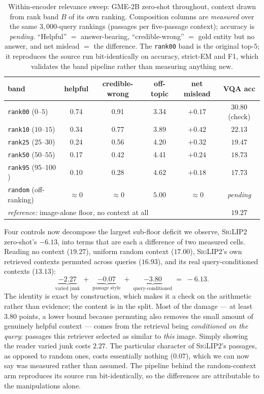 \begin{table}[t]
\centering\small
\caption{Within-encoder relevance sweep: \textsc{GME-2B} zero-shot throughout, context drawn from
rank band $B$ of its own ranking. Composition columns are \emph{measured} over the same
$3{,}000$-query rankings (passages per five-passage context); accuracy is \emph{pending}.
``Helpful'' $=$ answer-bearing, ``credible-wrong'' $=$ gold entity but no answer, and net mislead
$=$ the difference. The \texttt{rank00} band is the original top-$5$; it reproduces the source run
bit-identically on accuracy, strict-EM and F1, which validates the band pipeline rather than
measuring anything new.}
\label{tab:mm_bands}
\begin{tabular}{lccccc}
\toprule
band & helpful & credible-wrong & off-topic & net mislead & VQA acc \\
\midrule
\texttt{rank00} ($0$--$5$)    & 0.74 & 0.91 & 3.34 & $+0.17$ & $30.80$ (check) \\
\texttt{rank10} ($10$--$15$)  & 0.34 & 0.77 & 3.89 & $\mathbf{+0.42}$ & $22.13$ \\
\texttt{rank25} ($25$--$30$)  & 0.24 & 0.56 & 4.20 & $+0.32$ & $19.47$ \\
\texttt{rank50} ($50$--$55$)  & 0.17 & 0.42 & 4.41 & $+0.24$ & $18.73$ \\
\texttt{rank95} ($95$--$100$) & 0.10 & 0.28 & 4.62 & $+0.18$ & $17.73$ \\
\texttt{random} (off-ranking) & ${\approx}0$ & ${\approx}0$ & $5.00$ & ${\approx}0$ & \emph{pending} \\
\midrule
\multicolumn{5}{l}{\emph{reference:} image-alone floor, no context at all} & $19.27$ \\
\bottomrule
\end{tabular}
\end{table}

Four controls now decompose the largest sub-floor deficit we observe, \textsc{SigLIP2}
zero-shot's $-6.13$, into terms that are each a difference of two measured cells. Reading no
context ($19.27$), uniform random context ($17.00$), \textsc{SigLIP2}'s own retrieved contexts
permuted across queries ($16.93$), and its real query-conditioned contexts ($13.13$):
\[
\underbrace{-2.27}_{\text{varied junk}} \;+\; \underbrace{-0.07}_{\text{passage style}}
\;+\; \underbrace{-3.80}_{\text{query-conditioned}} \;=\; -6.13 .
\]
The identity is exact by construction, which makes it a check on the arithmetic rather than
evidence; the content is in the split. Most of the damage --- at least $3.80$ points, a lower
bound because permuting also removes the small amount of genuinely helpful context --- comes from
the retrieval being \emph{conditioned on the query}: passages this retriever selected as similar
to \emph{this} image. Simply showing the reader varied junk costs $2.27$. The particular
character of \textsc{SigLIP2}'s passages, as opposed to random ones, costs essentially nothing
($0.07$), which we can now say was measured rather than assumed. The pipeline behind the
random-context arm reproduces its source run bit-identically, so the differences are attributable
to the manipulations alone.

